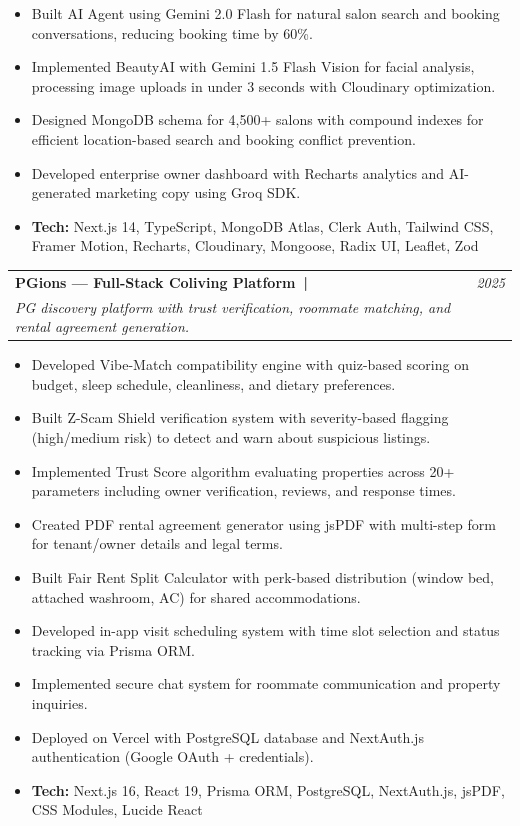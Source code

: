 \documentclass[a4paper,11pt]{article}
\makeatletter
\newcommand{\resumeProject}[3]{
\vspace{0.5mm}\item
\begin{tabular*}{0.98\textwidth}[t]{l@{\extracolsep{\fill}}r}
\textbf{\small #1} & \textit{\small #3} \\
\small\textit{#2}
\end{tabular*}
\vspace{-2mm}
}
\newcommand{\resumeItemListStart}{\begin{itemize}[leftmargin=3ex, rightmargin=2ex, topsep=0pt, itemsep=-1pt]\small}
\newcommand{\resumeItemListEnd}{\end{itemize}\vspace{-2mm}}
\makeatother
\begin{document}
\resumeItemListStart
\item Built AI Agent using Gemini 2.0 Flash for natural salon search and booking conversations, reducing booking time by 60\%.
\item Implemented BeautyAI with Gemini 1.5 Flash Vision for facial analysis, processing image uploads in under 3 seconds with Cloudinary optimization.
\item Designed MongoDB schema for 4,500+ salons with compound indexes for efficient location-based search and booking conflict prevention.
\item Developed enterprise owner dashboard with Recharts analytics and AI-generated marketing copy using Groq SDK.
\item \textbf{Tech:} Next.js 14, TypeScript, MongoDB Atlas, Clerk Auth, Tailwind CSS, Framer Motion, Recharts, Cloudinary, Mongoose, Radix UI, Leaflet, Zod
\resumeItemListEnd

\resumeProject
{PGions --- Full-Stack Coliving Platform\ \normalfont\small| \href{https://pgions.vercel.app/}{\small\textcolor{blue}{\faGlobe}} \href{https://github.com/ankit4563564/Pgions}{\small\textcolor{blue}{\faGithub}}}
{PG discovery platform with trust verification, roommate matching, and rental agreement generation.}
{2025}

\resumeItemListStart
\item Developed Vibe-Match compatibility engine with quiz-based scoring on budget, sleep schedule, cleanliness, and dietary preferences.
\item Built Z-Scam Shield verification system with severity-based flagging (high/medium risk) to detect and warn about suspicious listings.
\item Implemented Trust Score algorithm evaluating properties across 20+ parameters including owner verification, reviews, and response times.
\item Created PDF rental agreement generator using jsPDF with multi-step form for tenant/owner details and legal terms.
\item Built Fair Rent Split Calculator with perk-based distribution (window bed, attached washroom, AC) for shared accommodations.
\item Developed in-app visit scheduling system with time slot selection and status tracking via Prisma ORM.
\item Implemented secure chat system for roommate communication and property inquiries.
\item Deployed on Vercel with PostgreSQL database and NextAuth.js authentication (Google OAuth + credentials).
\item \textbf{Tech:} Next.js 16, React 19, Prisma ORM, PostgreSQL, NextAuth.js, jsPDF, CSS Modules, Lucide React
\resumeItemListEnd
\end{document}
